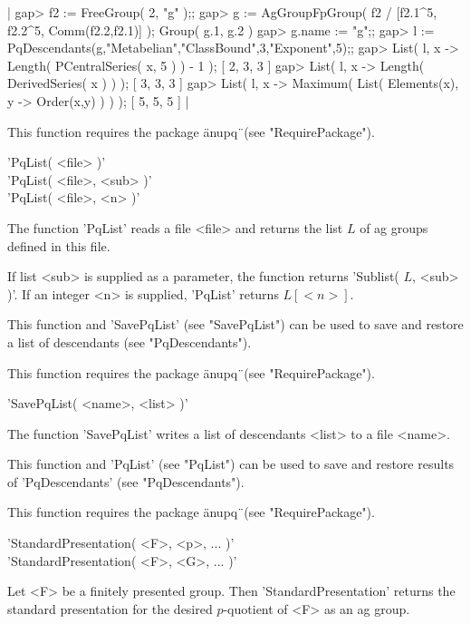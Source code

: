 |    gap> f2 := FreeGroup( 2, "g" );;
    gap> g := AgGroupFpGroup( f2 / [f2.1^5, f2.2^5, Comm(f2.2,f2.1)] );
    Group( g.1, g.2 )
    gap> g.name := "g";;
    gap> l := PqDescendants(g,"Metabelian","ClassBound",3,"Exponent",5);;
    gap> List( l, x -> Length( PCentralSeries( x, 5 ) ) - 1 );
    [ 2, 3, 3 ]
    gap> List( l, x -> Length( DerivedSeries( x ) ) );
    [ 3, 3, 3 ]
    gap> List( l, x -> Maximum( List( Elements(x), y -> Order(x,y) ) ) );
    [ 5, 5, 5 ] |

This function requires the package \"anupq\"\ (see "RequirePackage").


'PqList( <file> )' \\
'PqList( <file>, <sub> )' \\
'PqList( <file>, <n> )'

The function 'PqList' reads a file  <file> and returns the list $L$ of ag
groups defined in this file.

If list <sub> is supplied as a parameter, the function  returns 'Sublist(
$L$, <sub> )'.  If an integer <n> is supplied, 'PqList' returns $L[<n>]$.

This  function  and  'SavePqList'  (see  "SavePqList")  can  be  used  to
save and restore a list of descendants (see "PqDescendants").

This function requires the package \"anupq\"\ (see "RequirePackage").


'SavePqList( <name>, <list> )'

The function 'SavePqList' writes a list of  descendants  <list> to a file
<name>.

This function and 'PqList' (see "PqList") can be used to save and restore
results of 'PqDescendants' (see "PqDescendants").

This function requires the package \"anupq\"\ (see "RequirePackage").


'StandardPresentation( <F>, <p>, ...  )' \\
'StandardPresentation( <F>, <G>, ...  )'

Let  <F> be  a  finitely  presented group.   Then  'StandardPresentation'
returns the standard presentation for the  desired $p$-quotient of <F> as
an ag group.


